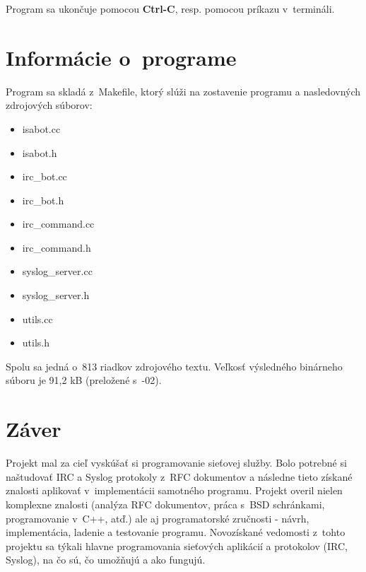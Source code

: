 Program sa ukončuje pomocou \textbf{Ctrl-C}, resp. pomocou príkazu  v~termináli.


\chapter{Informácie o~programe}

Program sa skladá z~Makefile, ktorý slúži na zostavenie programu a nasledovných zdrojových súborov:

\begin{itemize}
\item isabot.cc
\item isabot.h
\item irc\_bot.cc
\item irc\_bot.h
\item irc\_command.cc
\item irc\_command.h
\item syslog\_server.cc
\item syslog\_server.h
\item utils.cc
\item utils.h
\end{itemize}

Spolu sa jedná o~813 riadkov zdrojového textu. Veľkosť výsledného binárneho súboru je 91,2 kB (preložené s~-02).

\chapter{Záver}
Projekt mal za cieľ vyskúšať si programovanie sieťovej služby. Bolo potrebné si naštudovať IRC a Syslog protokoly z~RFC dokumentov a následne tieto získané znalosti aplikovať v~implementácii samotného programu. Projekt overil nielen komplexne znalosti (analýza RFC dokumentov, práca s~BSD schránkami, programovanie v~C++, atď.) ale aj programatorské zručnosti - návrh, implementácia, ladenie a testovanie programu. Novozískané vedomosti z~tohto projektu sa týkali hlavne programovania sieťových aplikácií a protokolov (IRC, Syslog), na čo sú, čo umožňujú a ako fungujú.
